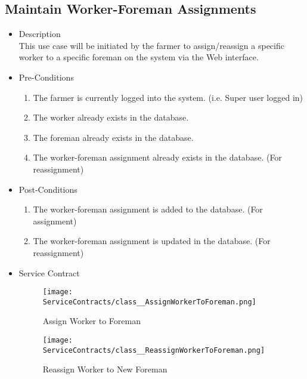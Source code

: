 \documentclass[11pt,fleqn]{book} %
\begin{document}
\subsection{Maintain Worker-Foreman Assignments}
\begin{itemize}
	\item Description\\
	This use case will be initiated by the farmer to assign/reassign a specific worker to a specific foreman on the system via the Web interface.
	\item Pre-Conditions
	\begin{enumerate}
		\item The farmer is currently logged into the system. (i.e. Super user logged in)
		\item The worker already exists in the database. 
		\item The foreman already exists in the database.
		\item The worker-foreman assignment already exists in the database. (For reassignment)				
	\end{enumerate}
	\item Post-Conditions
	\begin{enumerate}
		\item The worker-foreman assignment is added to the database. (For assignment)
		\item The worker-foreman assignment is updated in the database. (For reassignment)		
	\end{enumerate}
	\item Service Contract
	\begin{figure}
		\texttt{[image: ServiceContracts/class\_\_AssignWorkerToForeman.png]}
		\caption{Assign Worker to Foreman}
	\end{figure}
	\begin{figure}
		\texttt{[image: ServiceContracts/class\_\_ReassignWorkerToForeman.png]}
		\caption{Reassign Worker to New Foreman}
	\end{figure}
\end{itemize}
\end{document}
